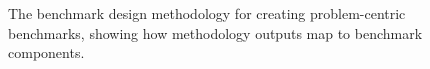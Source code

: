     
    \begin{figure}[h!]
        \begin{center}
            
            \caption{The \gai benchmark design methodology for creating problem-centric benchmarks, showing how methodology outputs map to benchmark components.}
            \label{Figure:ch1-framework}
        \end{center}
    \end{figure}

